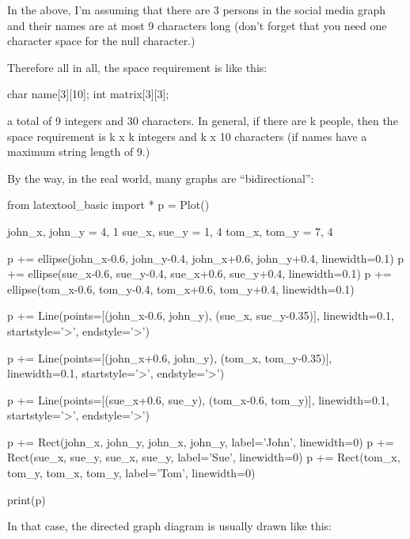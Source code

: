In the above, I'm assuming that there are 3 persons in the social media graph and their names are at most 9 characters long (don't forget that you need one character space for the null character.)

Therefore all in all, the space requirement is like this:

\begin{consolethree}[escapeinside=||]
char name[3][10];
int matrix[3][3];
\end{consolethree}

a total of 9 integers and 30 characters. In general, if there are k
people, then the space requirement is k x k integers and k x 10
characters (if names have a maximum string length of 9.)






By the way, in the real world, many graphs are ``bidirectional'':

\begin{python}
from latextool_basic import *
p = Plot()

john_x, john_y = 4, 1
sue_x, sue_y = 1, 4
tom_x, tom_y = 7, 4

p += ellipse(john_x-0.6, john_y-0.4, john_x+0.6, john_y+0.4, linewidth=0.1)
p += ellipse(sue_x-0.6, sue_y-0.4, sue_x+0.6, sue_y+0.4, linewidth=0.1)
p += ellipse(tom_x-0.6, tom_y-0.4, tom_x+0.6, tom_y+0.4, linewidth=0.1)

p += Line(points=[(john_x-0.6, john_y), (sue_x, sue_y-0.35)], linewidth=0.1, startstyle='>', endstyle='>')

p += Line(points=[(john_x+0.6, john_y), (tom_x, tom_y-0.35)], linewidth=0.1, startstyle='>', endstyle='>')

p += Line(points=[(sue_x+0.6, sue_y), (tom_x-0.6, tom_y)], linewidth=0.1, startstyle='>', endstyle='>')

p += Rect(john_x, john_y, john_x, john_y, label='John', linewidth=0)
p += Rect(sue_x, sue_y, sue_x, sue_y, label='Sue', linewidth=0)
p += Rect(tom_x, tom_y, tom_x, tom_y, label='Tom', linewidth=0)

print(p)
\end{python}

In that case, the directed graph diagram is usually drawn like this:

